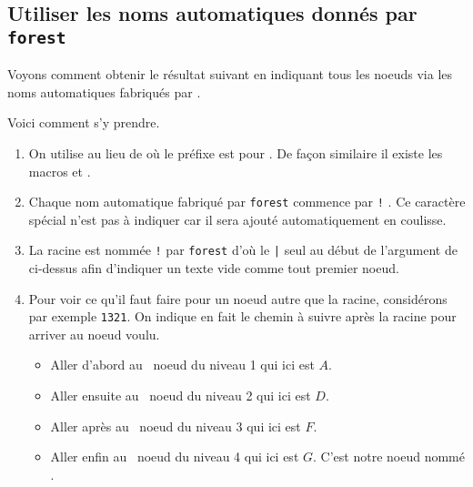\documentclass[12pt,a4paper]{article}
\begin{document}

\subsection{Utiliser les noms automatiques donnés par \texttt{forest}} \label{tnsproba-autonum-forest}

Voyons comment obtenir le résultat suivant en indiquant tous les noeuds via les noms automatiques fabriqués par \verb@forest@.



Voici comment s'y prendre.

\begin{enumerate}
	\item On utilise  au lieu de  où le préfixe  est pour .
	      De façon similaire il existe les macros   et  .


	\item Chaque nom automatique fabriqué par \verb#forest# commence par \texttt{!} . Ce caractère spécial n'est pas à indiquer car il sera ajouté automatiquement en coulisse.

	
	\item La racine est nommée \texttt{!} par \verb#forest# d'où le \verb#|# seul au début de l'argument de  ci-dessus afin d'indiquer un texte vide comme tout premier noeud.

	
	\item Pour voir ce qu'il faut faire pour un noeud autre que la racine, considérons par exemple \texttt{1321}. On indique en fait le chemin à suivre après la racine pour arriver au noeud voulu.
	\begin{itemize}
		\item Aller d'abord au \,\ier{} noeud du niveau 1 qui ici est $A$.

		\item Aller ensuite au \,\ieme{} noeud du niveau 2 qui ici est $D$.

		\item Aller après au \,\ieme{} noeud du niveau 3 qui ici est $F$.
		
		\item Aller enfin au \,\ier{} noeud du niveau 4 qui ici est $G$. C'est notre noeud nommé .
	\end{itemize}
\end{enumerate}
\end{document}
